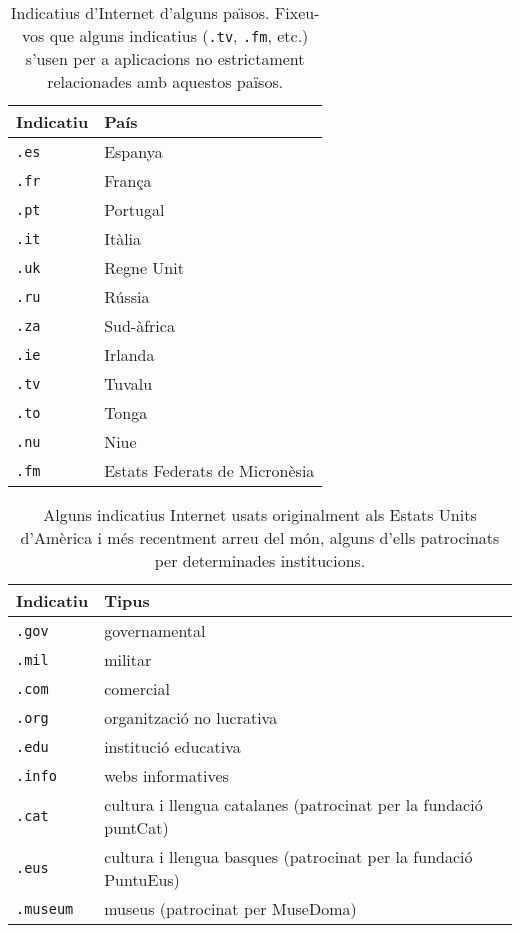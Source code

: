 \begin{table}
\begin{center}
\begin{tabular}{l|l}
\hline\hline
{\sc Indicatiu} & {\sc País} \\\hline
{\tt .es} & Espanya \\
{\tt .fr} & França \\
{\tt .pt} & Portugal \\
{\tt .it} & Itàlia \\
{\tt .uk} & Regne Unit \\
{\tt .ru} & Rússia \\
{\tt .za} & Sud-àfrica \\
{\tt .ie} & Irlanda \\
{\tt .tv} & Tuvalu \\
{\tt .to} & Tonga \\
{\tt .nu} & Niue \\
{\tt .fm} & Estats Federats de Micronèsia \\
\hline
\end{tabular}
\end{center}
\caption{Indicatius d'Internet d'alguns pa\"{\i}sos. Fixeu-vos que
  alguns indicatius (\texttt{.tv}, \texttt{.fm}, etc.) s'usen per a
  aplicacions no estrictament relacionades amb aquestos països.}
\label{tb:pais}
\end{table}

\begin{table}
\begin{center}
\begin{tabular}{l|l}
\hline\hline
{\sc Indicatiu} & {\sc Tipus} \\\hline
{\tt .gov} & governamental \\
{\tt .mil} & militar \\
{\tt .com} & comercial \\
{\tt .org} & organització no lucrativa \\
{\tt .edu} & institució educativa \\
{\tt .info} & webs informatives \\
{\tt .cat} & cultura i llengua catalanes (patrocinat per la fundació puntCat) \\
{\tt .eus} & cultura i llengua basques (patrocinat per la fundació PuntuEus) \\
{\tt .museum} & museus (patrocinat per MuseDoma) \\
\hline\end{tabular}
\end{center}
\caption{Alguns indicatius Internet usats originalment als Estats
  Units d'Amèrica i més recentment arreu del
  món, alguns d'ells patrocinats per determinades institucions.}
\label{tb:tipus}
\end{table}

